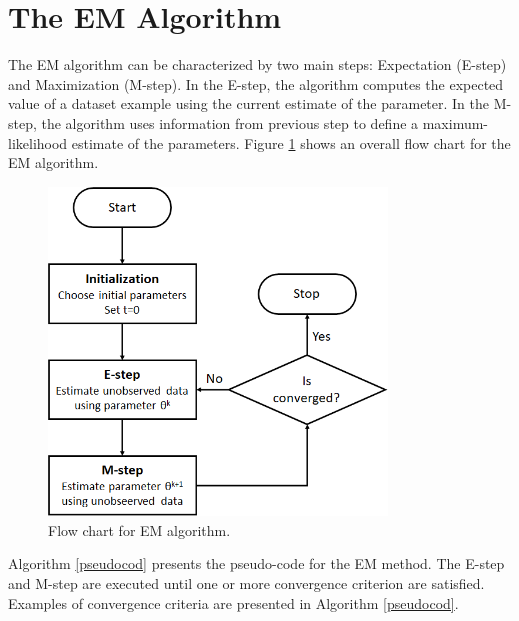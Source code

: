 \section{The EM Algorithm}
\label{sec:algorithm}


The EM algorithm can be characterized by two main steps: Expectation (E-step) and Maximization (M-step). In the E-step, the algorithm computes the expected value of a dataset example using the current estimate of the parameter. In the M-step, the algorithm uses information from previous step to define a maximum-likelihood estimate of the parameters. Figure \ref{EM-algorithm} shows an overall flow chart for the EM algorithm.


\begin{figure}[ht]
\centering
\includegraphics[width=9cm]{"Part 3 - Learning Systems/Unsupervised Learning/Expectation-Maximization/figures/algorithm.png"}
\caption{Flow chart for EM algorithm.}
\label{EM-algorithm}
\end{figure}


Algorithm \ref{pseudocod} presents the pseudo-code for the EM method. The E-step and M-step are executed until one or more convergence criterion are satisfied. Examples of convergence criteria are presented in Algorithm \ref{pseudocod}.

